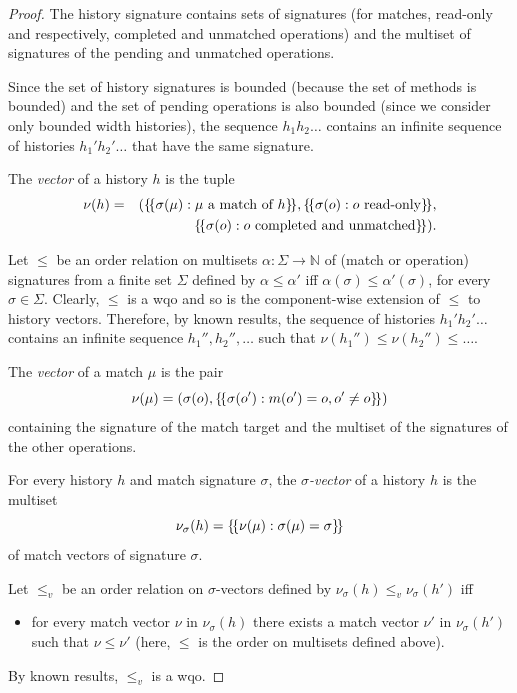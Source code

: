 \begin{proof}
The history signature contains sets of signatures 
(for matches, read-only and respectively, completed and unmatched operations) 
and the multiset of signatures of the pending and unmatched operations.

Since the set of history signatures is bounded (because the set of methods is bounded)
and the set of pending operations is also bounded (since we consider only bounded width histories),
the sequence $h_1 h_2\ldots $ contains an infinite sequence of histories $h_1' h_2' \ldots$ that have 
the same signature. 

%

The \emph{vector} of a history $h$ is the tuple
\begin{align*}
\nu(h)&=&({\{\!\{ \sigma(\mu): \mu\mbox{ a match of $h$} \}\!\}}, {\{\!\{ \sigma(o): o\mbox{ read-only} \}\!\}}, \\
&& {\{\!\{ \sigma(o): o\mbox{ completed and unmatched} \}\!\}}).
\end{align*}

Let $\leq$ be an order relation on multisets $\alpha:\Sigma\rightarrow\mathbb{N}$ of (match or operation) signatures from a finite set $\Sigma$ 
defined by $\alpha\leq\alpha'$ iff $\alpha(\sigma)\leq\alpha'(\sigma)$, for every $\sigma\in\Sigma$.
Clearly, $\leq$ is a wqo and so is the component-wise extension of $\leq$ to history vectors.
Therefore, by known results, the sequence of histories $h_1' h_2' \ldots$ contains 
an infinite sequence $h_1'',h_2'',\ldots$ such that $\nu(h_1'')\leq \nu(h_2'')\leq \ldots$.

The \emph{vector} of a match $\mu$ is the pair
\[
\nu(\mu)=(\sigma(o),{\{\!\{ \sigma(o') : m(o')=o, o'\neq o \}\!\}})
\]
containing the signature of the match target and the multiset of the signatures of the other operations.

For every history $h$ and match signature $\sigma$, the \emph{$\sigma$-vector} of a history $h$ is the multiset
\[
\nu_\sigma(h)={\{\!\{ \nu(\mu): \sigma(\mu)=\sigma \}\!\}}
\]
of match vectors of signature $\sigma$.

Let $\leq_v$ be an order relation on $\sigma$-vectors defined by $\nu_\sigma(h)\leq_v \nu_\sigma(h')$ iff
\begin{itemize}
	\item for every match vector $\nu$ in $\nu_\sigma(h)$ there exists a match vector $\nu'$ in $\nu_\sigma(h')$
	such that $\nu\leq \nu'$ (here, $\leq$ is the order on multisets defined above).
\end{itemize}
By known results, $\leq_v$ is a wqo.


\end{proof}
